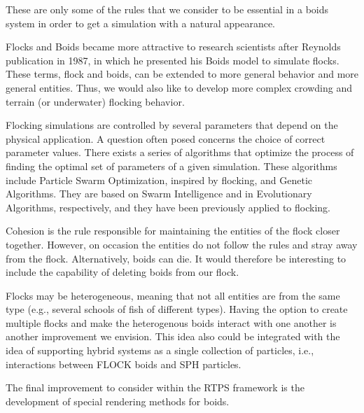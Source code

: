These are only some of the rules that we consider to be essential in a boids system in order to get a simulation with a natural appearance.

Flocks and Boids became more attractive to research scientists after Reynolds publication in 1987\cite{craig1}, in which he presented his Boids model to simulate flocks. These terms, flock and boids, can be extended to more general behavior and more general entities. Thus, we would also like to develop more complex crowding and terrain (or underwater) flocking behavior\cite{supermassiveCrowd}. 

Flocking simulations are controlled by several parameters that depend on the physical application. A question often posed concerns the choice of correct parameter values. 
There exists a series of algorithms that optimize the process of finding the optimal set of parameters of a given simulation. These algorithms include Particle Swarm Optimization, inspired by flocking, and Genetic Algorithms. They are based on Swarm Intelligence and in Evolutionary Algorithms, respectively, and they have been previously applied to flocking\cite{opt_params_GA}.

Cohesion is the rule responsible for maintaining the entities of the flock closer together. However, on occasion the entities do not follow the rules and stray away from the flock. Alternatively, boids can die. It would therefore be interesting to include the capability of deleting boids from our flock. 

Flocks may be heterogeneous, meaning that not all entities are from the same type  (e.g., several schools of fish of different types). Having the option to create multiple flocks and make the heterogenous boids interact with one another is another improvement we envision. This idea also could be integrated  with the idea of supporting hybrid systems as a single collection of particles, i.e., interactions between FLOCK boids and SPH particles.

The final improvement to consider within the RTPS framework is the development of special rendering methods for boids. 

